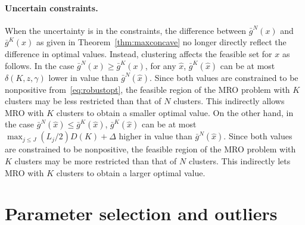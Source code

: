\documentclass[12pt]{article}
\theoremstyle{thmstyleone}%
\theoremstyle{thmstyletwo}%
\theoremstyle{thmstylethree}%
\newcommand{\reviewChanges}{}
\begin{document}
\reviewChanges{
\paragraph{Uncertain constraints.}%
\label{par:uncertain_constraints_max}
When the uncertainty is in the constraints, the difference between $\bar{g}^N(x)$ and $\bar{g}^K(x)$ as given in Theorem~\ref{thm:maxconcave} no longer directly reflect the difference in optimal values.
Instead, clustering affects the feasible set for $x$ as follows.
In the case $\bar{g}^N(x) \geq \bar{g}^K(x)$, for any $\hat{x}$, $\bar{g}^K(\hat{x})$ can be at most $\delta(K,z,\gamma)$ lower in value than $\bar{g}^N(\hat{x})$.
Since both values are constrained to be nonpositive from~\eqref{eq:robustopt}, the feasible region of the \gls{MRO} problem with $K$ clusters may be less restricted than that of $N$ clusters. This indirectly allows \gls{MRO} with $K$ clusters to obtain a smaller optimal value.
On the other hand, in the case $\bar{g}^N(\hat{x}) \leq \bar{g}^K(\hat{x})$, 
$\bar{g}^K(\hat{x})$ can be at most $\max_{j\leq J}(L_j/2)D(K) + \Delta$ higher in value than $\bar{g}^N(\hat{x})$. 
Since both values are constrained to be nonpositive, the feasible region of the \gls{MRO} problem with $K$ clusters may be more restricted than that of $N$ clusters. This indirectly lets \gls{MRO} with $K$ clusters to obtain a larger optimal value.
}


\section{Parameter selection \reviewChanges{and outliers}}
\label{sec:parameter_selection}
\end{document}
